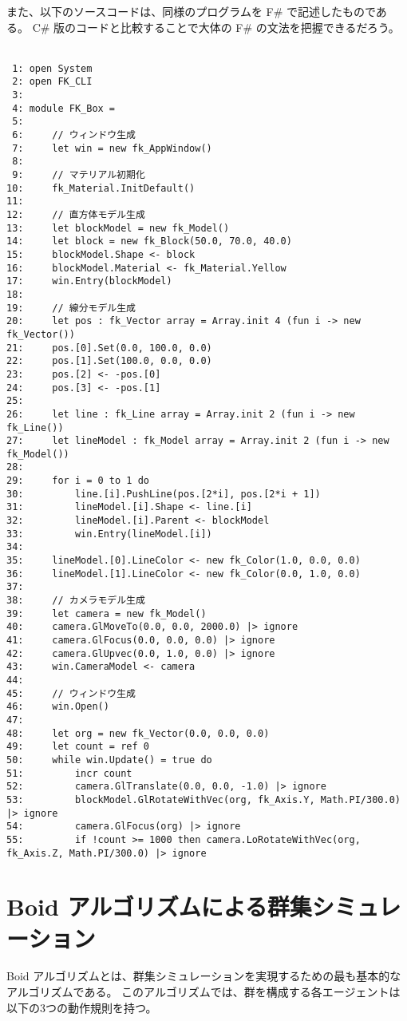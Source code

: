 また、以下のソースコードは、同様のプログラムを F\# で記述したものである。
C\# 版のコードと比較することで大体の F\# の文法を把握できるだろう。\\ ~

\begin{breakbox}
\begin{small}
\begin{verbatim}
 1: open System
 2: open FK_CLI
 3: 
 4: module FK_Box =
 5: 
 6:     // ウィンドウ生成
 7:     let win = new fk_AppWindow()
 8: 
 9:     // マテリアル初期化
10:     fk_Material.InitDefault()
11: 
12:     // 直方体モデル生成
13:     let blockModel = new fk_Model()
14:     let block = new fk_Block(50.0, 70.0, 40.0)
15:     blockModel.Shape <- block
16:     blockModel.Material <- fk_Material.Yellow
17:     win.Entry(blockModel)
18: 
19:     // 線分モデル生成
20:     let pos : fk_Vector array = Array.init 4 (fun i -> new fk_Vector())
21:     pos.[0].Set(0.0, 100.0, 0.0)
22:     pos.[1].Set(100.0, 0.0, 0.0)
23:     pos.[2] <- -pos.[0]
24:     pos.[3] <- -pos.[1]
25: 
26:     let line : fk_Line array = Array.init 2 (fun i -> new fk_Line())
27:     let lineModel : fk_Model array = Array.init 2 (fun i -> new fk_Model())
28: 
29:     for i = 0 to 1 do
30:         line.[i].PushLine(pos.[2*i], pos.[2*i + 1])
31:         lineModel.[i].Shape <- line.[i]
32:         lineModel.[i].Parent <- blockModel
33:         win.Entry(lineModel.[i])
34: 
35:     lineModel.[0].LineColor <- new fk_Color(1.0, 0.0, 0.0)
36:     lineModel.[1].LineColor <- new fk_Color(0.0, 1.0, 0.0)
37: 
38:     // カメラモデル生成
39:     let camera = new fk_Model()
40:     camera.GlMoveTo(0.0, 0.0, 2000.0) |> ignore
41:     camera.GlFocus(0.0, 0.0, 0.0) |> ignore
42:     camera.GlUpvec(0.0, 1.0, 0.0) |> ignore
43:     win.CameraModel <- camera
44: 
45:     // ウィンドウ生成
46:     win.Open()
47: 
48:     let org = new fk_Vector(0.0, 0.0, 0.0)
49:     let count = ref 0
50:     while win.Update() = true do
51:         incr count
52:         camera.GlTranslate(0.0, 0.0, -1.0) |> ignore
53:         blockModel.GlRotateWithVec(org, fk_Axis.Y, Math.PI/300.0) |> ignore
54:         camera.GlFocus(org) |> ignore
55:         if !count >= 1000 then camera.LoRotateWithVec(org, fk_Axis.Z, Math.PI/300.0) |> ignore
\end{verbatim}
\end{small}
\end{breakbox}

\section{Boid アルゴリズムによる群集シミュレーション}
Boid アルゴリズムとは、群集シミュレーションを実現するための最も基本的なアルゴリズムである。
このアルゴリズムでは、群を構成する各エージェントは以下の3つの動作規則を持つ。

